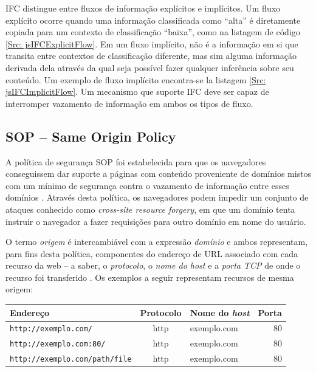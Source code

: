 IFC distingue entre fluxos de informação explícitos e implícitos. Um fluxo explícito ocorre quando uma informação classificada como ``alta'' é diretamente copiada para um contexto de classificação ``baixa'', como na listagem de código \ref{Src: jsIFCExplicitFlow}. Em um fluxo implícito, não é a informação em si que transita entre contextos de classificação diferente, mas sim alguma informação derivada dela através da qual seja possível fazer qualquer inferência sobre seu conteúdo. Um exemplo de fluxo implícito encontra-se la listagem \ref{Src: jsIFCImplicitFlow}. Um mecanismo que suporte IFC deve ser capaz de interromper vazamento de informação em ambos os tipos de fluxo.






\subsection{SOP -- Same Origin Policy}
A política de segurança SOP foi estabelecida para que os navegadores conseguissem dar suporte a páginas com conteúdo proveniente de domínios mistos com um mínimo de segurança contra o vazamento de informação entre esses domínios \cite{Hill2016}. Através desta política, os navegadores podem impedir um conjunto de ataques conhecido como \textit{cross-site resource forgery}, em que um domínio tenta instruir o navegador a fazer requisições para outro domínio em nome do usuário.

O termo \textit{origem} é intercambiável com a expressão \textit{domínio} e ambos representam, para fins desta política, componentes do endereço de URL associado com cada recurso da web -- a saber, o \textit{protocolo}, o \textit{nome do host} e a \textit{porta TCP} de onde o recurso foi transferido \cite{Barth2011}. Os exemplos a seguir representam recursos de mesma origem:

{
	\small \begin{tabular}{|l|c|l|r|}
		\hline 
		Endereço & Protocolo & Nome do \textit{host} & Porta \\ 
		\hline 
		\texttt{http://exemplo.com/} & http & exemplo.com & 80 \\ 
		\hline 
		\texttt{http://exemplo.com:80/} & http & exemplo.com & 80 \\ 
		\hline 
		\texttt{http://exemplo.com/path/file} & http & exemplo.com & 80 \\ 
		\hline 
	\end{tabular}
}


